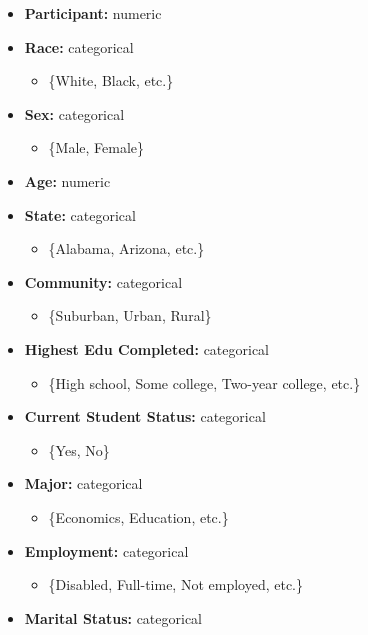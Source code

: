 \begin{itemize}
    \item \textbf{Participant:} numeric
    \item \textbf{Race:} categorical 
    \begin{itemize}
        \item  \{White, Black, etc.\}
    \end{itemize}
    \item \textbf{Sex:} categorical 
    \begin{itemize}
        \item  \{Male, Female\}
    \end{itemize}
    \item \textbf{Age:} numeric
    \item \textbf{State:} categorical 
    \begin{itemize}
        \item  \{Alabama, Arizona, etc.\}
    \end{itemize}
    \item \textbf{Community:} categorical 
    \begin{itemize}
        \item  \{Suburban, Urban, Rural\}
    \end{itemize}
    \item \textbf{Highest Edu Completed:} categorical 
    \begin{itemize}
        \item  \{High school, Some college, Two-year college, etc.\}
    \end{itemize}
    \item \textbf{Current Student Status:} categorical 
    \begin{itemize}
        \item  \{Yes, No\}
    \end{itemize}
    \item \textbf{Major:} categorical 
    \begin{itemize}
        \item  \{Economics, Education, etc.\}
    \end{itemize}
    \item \textbf{Employment:} categorical 
    \begin{itemize}
        \item  \{Disabled, Full-time, Not employed, etc.\}
    \end{itemize}
    \item \textbf{Marital Status:} categorical
    \begin{itemize}

\end{itemize}
\end{itemize}
